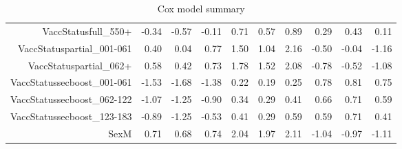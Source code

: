 \begin{table}[ht]
\begin{tabular}{rrrrrrrrrr}
  VaccStatusfull\_550+ & -0.34 & -0.57 & -0.11 & 0.71 & 0.57 & 0.89 & 0.29 & 0.43 & 0.11 \\ 
  VaccStatuspartial\_001-061 & 0.40 & 0.04 & 0.77 & 1.50 & 1.04 & 2.16 & -0.50 & -0.04 & -1.16 \\ 
  VaccStatuspartial\_062+ & 0.58 & 0.42 & 0.73 & 1.78 & 1.52 & 2.08 & -0.78 & -0.52 & -1.08 \\ 
  VaccStatussecboost\_001-061 & -1.53 & -1.68 & -1.38 & 0.22 & 0.19 & 0.25 & 0.78 & 0.81 & 0.75 \\ 
  VaccStatussecboost\_062-122 & -1.07 & -1.25 & -0.90 & 0.34 & 0.29 & 0.41 & 0.66 & 0.71 & 0.59 \\ 
  VaccStatussecboost\_123-183 & -0.89 & -1.25 & -0.53 & 0.41 & 0.29 & 0.59 & 0.59 & 0.71 & 0.41 \\ 
  SexM & 0.71 & 0.68 & 0.74 & 2.04 & 1.97 & 2.11 & -1.04 & -0.97 & -1.11 \\ 
   \hline
\end{tabular}
\caption{Cox model summary} 
\end{table}
